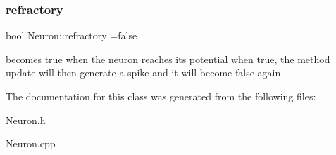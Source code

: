 \subsubsection{\texorpdfstring{refractory}{refractory}}
{\footnotesize\ttfamily bool Neuron\+::refractory =false\hspace{0.3cm}{\ttfamily [private]}}

becomes true when the neuron reaches it\textquotesingle{}s potential when true, the method update will then generate a spike and it will become false again 

The documentation for this class was generated from the following files\+:\begin{DoxyCompactItemize}
\item 
Neuron.\+h\item 
Neuron.\+cpp\end{DoxyCompactItemize}
